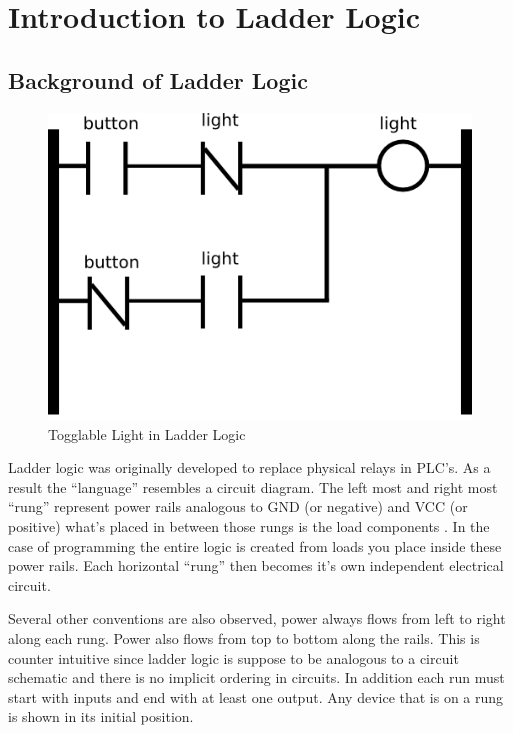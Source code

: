 
\chapter{Introduction to Ladder Logic}
\section{Background of Ladder Logic}
\label{section:ladderlogic}

\begin{figure}[htp]
    \centering
    \includegraphics[width=\imgsmlphoto]{./images/lltoggle_light.png}
    \caption{Togglable Light in Ladder Logic}
    \label{fig:lltoggle_light}
\end{figure}

Ladder logic was originally developed to replace physical relays in PLC's.
As a result the ``language'' resembles a circuit diagram. The left most
and right most ``rung'' represent power rails analogous to GND (or negative)
 and VCC (or positive) what's
placed in between those rungs is the load components \cite{ebookmorris}. In 
the case of programming the entire logic is created from loads you place 
inside these power rails. Each horizontal ``rung'' then becomes it's own
independent electrical circuit.

Several other conventions are also observed, power always flows from left 
to right along each rung. Power also flows from top to bottom along the 
rails. This is counter intuitive since ladder logic is suppose to be 
analogous to a circuit schematic and there is no implicit
ordering in circuits. In addition each run must start with inputs and end
with at least one output. Any device that is on a rung is shown in its
initial position.

